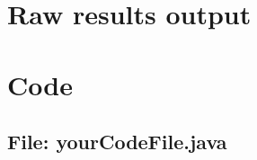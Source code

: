 \documentclass[11pt,openright,a4paper]{report}
\begin{document}
\chapter{Raw results output}

\chapter{Code}


\begin{landscape}
\begin{multicols}{2}
\section{File: yourCodeFile.java}

\end{multicols}
\end{landscape}
\end{document}
